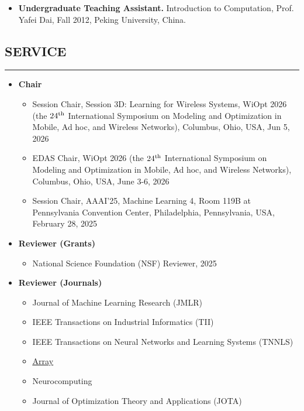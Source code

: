 \documentclass[10pt,letter]{article}
\begin{document}
\begin{small}
\begin{itemize}
\item {\bf Undergraduate Teaching Assistant.} Introduction to Computation, Prof. Yafei Dai, Fall 2012, Peking University, China.

\end{itemize}


\subsection*{SERVICE}
\hrule
\vspace{0.2cm}
\begin{itemize}
        \item \textbf{Chair}
        \begin{itemize}
            \item Session Chair, Session 3D: Learning for Wireless Systems, WiOpt 2026 (the $24\textsuperscript{th}$ International Symposium on Modeling and Optimization in Mobile, Ad hoc, and Wireless Networks), Columbus, Ohio, USA, Jun 5, 2026
            \item EDAS Chair, WiOpt 2026 (the $24\textsuperscript{th}$ International Symposium on Modeling and Optimization in Mobile, Ad hoc, and Wireless Networks), Columbus, Ohio, USA, June 3-6, 2026 
            \item Session Chair, AAAI'25, Machine Learning 4, Room 119B at Pennsylvania Convention Center, Philadelphia, Pennsylvania, USA, February 28, 2025
        \end{itemize}
        \item \textbf{Reviewer (Grants)}
        \begin{itemize}
            \item National Science Foundation (NSF) Reviewer, 2025
        \end{itemize}
	\item \textbf{Reviewer (Journals)}
	\begin{itemize}[itemsep=1pt]
            \item Journal of Machine Learning Research (JMLR)
            \item IEEE Transactions on Industrial Informatics (TII)
            \item IEEE Transactions on Neural Networks and Learning Systems (TNNLS)
            \item \href{https://www.sciencedirect.com/journal/array}{\underline{Array}}
            \item Neurocomputing
            \item Journal of Optimization Theory and Applications (JOTA)


\end{itemize}
\end{itemize}
\end{small}
\end{document}

